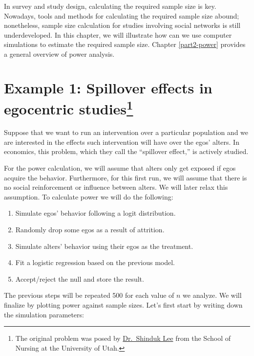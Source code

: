\documentclass[]{book}
\begin{document}
In survey and study design, calculating the required sample size is key. Nowadays, tools and methods for calculating the required sample size abound; nonetheless, sample size calculation for studies involving social networks is still underdeveloped. In this chapter, we will illustrate how can we use computer simulations to estimate the required sample size. Chapter \ref{part2-power} provides a general overview of power analysis.

\hypertarget{example-1-spillover-effects-in-egocentric-studiescredit-ego-power}{%
\section[Example 1: Spillover effects in egocentric studies]{\texorpdfstring{Example 1: Spillover effects in egocentric studies\footnote{The original problem was posed by \href{https://faculty.utah.edu/u6037777-SHINDUK_LEE/hm/index.hml}{Dr.~Shinduk Lee} from the School of Nursing at the University of Utah.}}{Example 1: Spillover effects in egocentric studies}}\label{example-1-spillover-effects-in-egocentric-studiescredit-ego-power}}

Suppose that we want to run an intervention over a particular population and we are interested in the effects such intervention will have over the egos' alters. In economics, this problem, which they call the ``spillover effect,'' is actively studied.

For the power calculation, we will assume that alters only get exposed if egos acquire the behavior. Furthermore, for this first run, we will assume that there is no social reinforcement or influence between alters. We will later relax this assumption. To calculate power we will do the following:

\begin{enumerate}
\def\labelenumi{\arabic{enumi}.}
\item
  Simulate egos' behavior following a logit distribution.
\item
  Randomly drop some egos as a result of attrition.
\item
  Simulate alters' behavior using their egos as the treatment.
\item
  Fit a logistic regression based on the previous model.
\item
  Accept/reject the null and store the result.
\end{enumerate}

The previous steps will be repeated 500 for each value of \(n\) we analyze. We will finalize by plotting power against sample sizes. Let's first start by writing down the simulation parameters:
\end{document}
